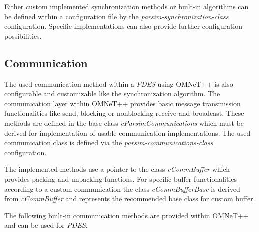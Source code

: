 Either custom implemented synchronization methods or built-in algorithms can be defined within a configuration file by the \emph{parsim-synchronization-class} configuration.
Specific implementations can also provide further configuration possibilities. \cite[section 16.3.5]{omnet_manual}

\subsection{Communication}
\label{sec:parallel_omnet_comm}

\begin{sloppypar}
The used communication method within a \emph{PDES} using OMNeT++ is also configurable and customizable like the synchronization algorithm.
The communication layer within OMNeT++ provides basic message transmission functionalities like send, blocking or nonblocking receive and broadcast.
These methods are defined in the base class \emph{cParsimCommunications} which must be derived for implementation of usable communication implementations. 
The used communication class is defined via the \emph{parsim-communications-class} configuration. \cite[section 16.3.5]{omnet_manual}
\end{sloppypar}

The implemented methods use a pointer to the class \emph{cCommBuffer} which provides packing and unpacking functions.
For specific buffer functionalities according to a custom communication the class \emph{cCommBufferBase} is derived from \emph{cCommBuffer} and represents the recommended base class for custom buffer. \cite{omnet_par_api}

\begin{sloppypar}
The following built-in communication methods are provided within OMNeT++ and can be used for \emph{PDES}. \cite[section 16.3.5]{omnet_manual} \cite{omnet_par_api}
\end{sloppypar}

